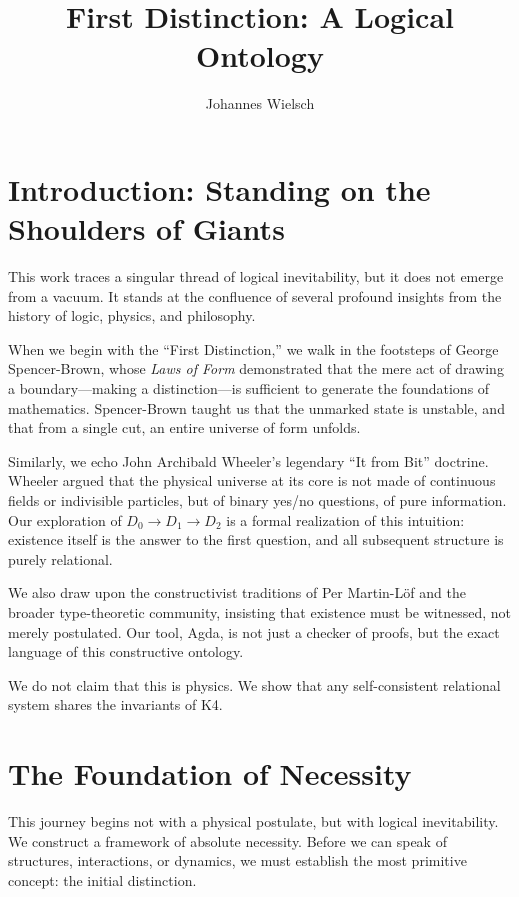 \documentclass[11pt,a4paper]{book}
\begin{document}
\frontmatter
\title{First Distinction: A Logical Ontology}
\author{Johannes Wielsch}
\maketitle

\mainmatter

\chapter{Introduction: Standing on the Shoulders of Giants}

This work traces a singular thread of logical inevitability, but it does not emerge from a vacuum. It stands at the confluence of several profound insights from the history of logic, physics, and philosophy.

When we begin with the ``First Distinction,'' we walk in the footsteps of George Spencer-Brown, whose \textit{Laws of Form} demonstrated that the mere act of drawing a boundary—making a distinction—is sufficient to generate the foundations of mathematics. Spencer-Brown taught us that the unmarked state is unstable, and that from a single cut, an entire universe of form unfolds.

Similarly, we echo John Archibald Wheeler's legendary ``It from Bit'' doctrine. Wheeler argued that the physical universe at its core is not made of continuous fields or indivisible particles, but of binary yes/no questions, of pure information. Our exploration of $D_0 \to D_1 \to D_2$ is a formal realization of this intuition: existence itself is the answer to the first question, and all subsequent structure is purely relational.

We also draw upon the constructivist traditions of Per Martin-Löf and the broader type-theoretic community, insisting that existence must be witnessed, not merely postulated. Our tool, Agda, is not just a checker of proofs, but the exact language of this constructive ontology.

We do not claim that this is physics. We show that any self-consistent relational system shares the invariants of K4.

\chapter{The Foundation of Necessity}

This journey begins not with a physical postulate, but with logical inevitability. We construct a framework of absolute necessity. Before we can speak of structures, interactions, or dynamics, we must establish the most primitive concept: the initial distinction. 
\end{document}
